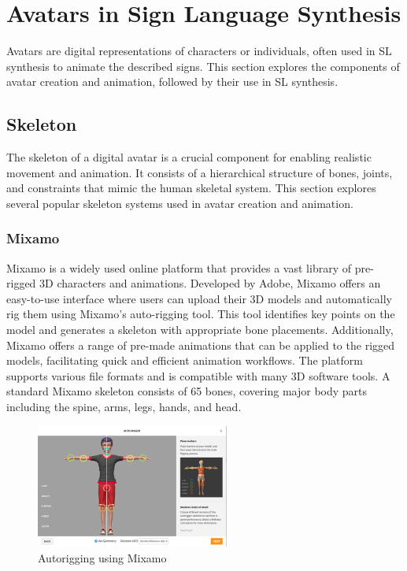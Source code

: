 \documentclass[../../main.tex]{subfiles}
\begin{document}
\section{Avatars in Sign Language Synthesis}

Avatars are digital representations of characters or individuals, often used in SL synthesis to animate the described signs. This section explores the components of avatar creation and animation, followed by their use in SL synthesis.

\subsection{Skeleton}

The skeleton of a digital avatar is a crucial component for enabling realistic movement and animation. It consists of a hierarchical structure of bones, joints, and constraints that mimic the human skeletal system. This section explores several popular skeleton systems used in avatar creation and animation.

\subsubsection{Mixamo}

Mixamo is a widely used online platform that provides a vast library of pre-rigged 3D characters and animations. Developed by Adobe, Mixamo offers an easy-to-use interface where users can upload their 3D models and automatically rig them using Mixamo's auto-rigging tool. This tool identifies key points on the model and generates a skeleton with appropriate bone placements. Additionally, Mixamo offers a range of pre-made animations that can be applied to the rigged models, facilitating quick and efficient animation workflows. The platform supports various file formats and is compatible with many 3D software tools. A standard Mixamo skeleton consists of 65 bones, covering major body parts including the spine, arms, legs, hands, and head.

\begin{figure}
  \centering \includegraphics[width = 2.5in]{chapters/background_work/images/mixamo_autorigging.png}
  \caption{Autorigging using Mixamo}
  \label{fig:mixamo_autorigging}
\end{figure}
\end{document}
